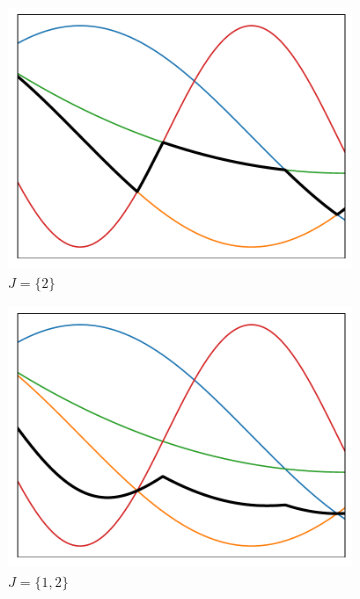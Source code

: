 \begin{figure}[H]
     \begin{subfigure}{0.32\textwidth}
         \centering
         \includegraphics[width=\textwidth]{pictures/var.pdf}
         \caption{$J=\{2\}$}
         \label{fig:var}
     \end{subfigure}
     \hfill
     \begin{subfigure}{0.32\textwidth}
         \centering
         \includegraphics[width=\textwidth]{pictures/lovo.pdf}
         \caption{$J=\{1,2\}$}
         \label{fig:lovo}
     \end{subfigure}
     \hfill
     \begin{subfigure}{0.32\textwidth}
         \centering

\end{subfigure}
\end{figure}
